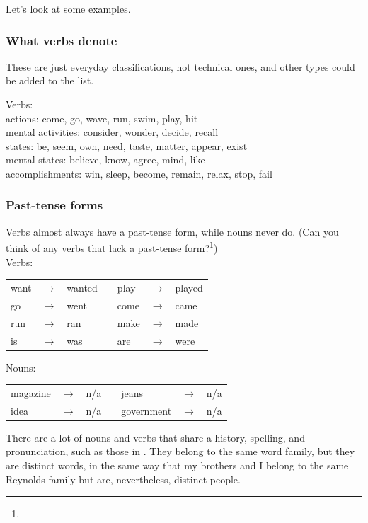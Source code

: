 Let's look at some examples.

\subsubsection*{What verbs denote}
These are just everyday classifications, not technical ones, and other types could be added to the list.

\ea Verbs:\\
    actions: come, go, wave, run, swim, play, hit\\
    mental activities: consider, wonder, decide, recall\\
    states: be, seem, own, need, taste, matter, appear, exist\\
    mental states: believe, know, agree, mind, like\\
    accomplishments: win, sleep, become, remain, relax, stop, fail
\z

\subsubsection*{Past-tense forms}\label{sec:past-forms}
Verbs almost always have a past-tense form, while nouns never do. (Can you think of any verbs that lack a past-tense form?\footnote{})\\

\ea\label{ex:past-tense-forms-verbs-vs-nouns}
    \ea Verbs:\\
    \begin{tabular}{@{} l l l l l l l}
    want & $\rightarrow$ & wanted && play & $\rightarrow$ & played \\
    go & $\rightarrow$ & went && come & $\rightarrow$ & came \\
    run & $\rightarrow$ & ran && make & $\rightarrow$ & made \\
    is & $\rightarrow$ & was && are & $\rightarrow$ & were \\
    \end{tabular}
    \ex Nouns:\\
    \begin{tabular}{@{} l l l l l l l}
    magazine & $\rightarrow$ & n/a && jeans & $\rightarrow$ & n/a \\
    idea & $\rightarrow$ & n/a && government & $\rightarrow$ & n/a \\
    \end{tabular}
\z
\z
{}There are a lot of nouns and verbs that share a history, spelling, and pronunciation, such as those in . They belong to the same \hyperref[sec:family-lemma-shape-token]{word family}, but they are distinct words, in the same way that my brothers and I belong to the same Reynolds family but are, nevertheless, distinct people.



